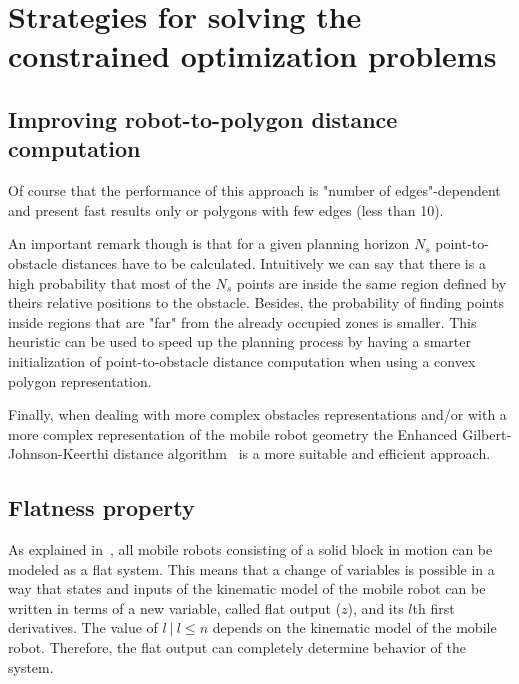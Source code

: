 \section{Strategies for solving the constrained optimization problems}

\subsection{Improving robot-to-polygon distance computation}

Of course that the performance of this approach is "number of edges"-dependent and present fast results only or 
polygons with few edges (less than 10). 

An important remark though is that for a given planning horizon $N_{s}$ point-to-obstacle distances have to be calculated. Intuitively we can say that there
is a high probability that most of the $N_{s}$ points are inside the same region defined by theirs relative positions to the obstacle.
Besides, the probability of finding points inside regions that are "far" from the already occupied zones is smaller.
This heuristic can be used to speed up the planning process by having a smarter initialization of point-to-obstacle distance computation when using a convex polygon representation.

Finally, when dealing with more complex obstacles representations and/or with a more complex representation of the mobile robot geometry the Enhanced Gilbert-Johnson-Keerthi distance algorithm~\cite{ericson2004real} is a more suitable and efficient approach.

\subsection{Flatness property}

As explained in~\cite{Defoort2007a}, all mobile robots consisting of a solid
block in motion can be modeled as a flat system. 
This means that a change of variables is possible in a way that states and
inputs of the kinematic model of the mobile robot can be written in terms
of a new variable, called flat output ($z$), and its $l$th first derivatives.
The value of $l\ |\ l \leq n$ depends on the kinematic model of the mobile robot.
Therefore, the flat output can completely determine behavior of the system.

